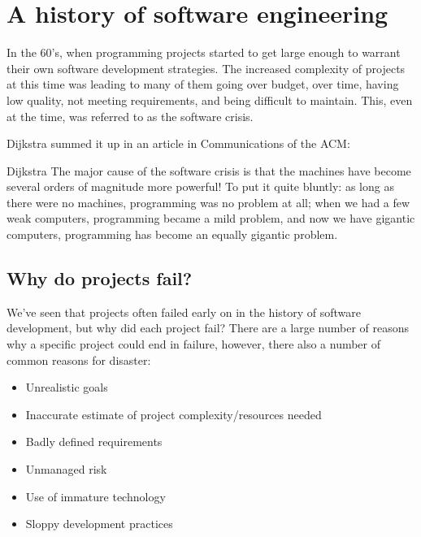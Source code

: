 
\section{A history of software engineering}

In the 60's, when programming projects started to get large enough to warrant
their own software development strategies. The increased complexity of projects
at this time was leading to many of them going over budget, over time, having
low quality, not meeting requirements, and being difficult to maintain. This,
even at the time, was referred to as the software crisis.

Dijkstra summed it up in an article in Communications of the ACM:

\begin{aquote}{Dijkstra}
  The major cause of the software crisis is that the machines have become
  several orders of magnitude more powerful! To put it quite bluntly: as long
  as there were no machines, programming was no problem at all; when we had a
  few weak computers, programming became a mild problem, and now we have
  gigantic computers, programming has become an equally gigantic problem.
\end{aquote}

\subsection{Why do projects fail?}

We've seen that projects often failed early on in the history of software
development, but why did each project fail? There are a large number of
reasons why a specific project could end in failure, however, there also a
number of common reasons for disaster:

\begin{itemize}
  \item Unrealistic goals
  \item Inaccurate estimate of project complexity/resources needed
  \item Badly defined requirements
  \item Unmanaged risk
  \item Use of immature technology
  \item Sloppy development practices
\end{itemize}

